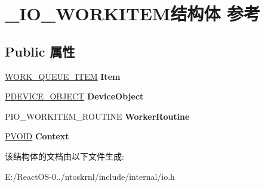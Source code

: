 \hypertarget{struct___i_o___w_o_r_k_i_t_e_m}{}\section{\+\_\+\+I\+O\+\_\+\+W\+O\+R\+K\+I\+T\+E\+M结构体 参考}
\label{struct___i_o___w_o_r_k_i_t_e_m}
\subsection*{Public 属性}
\begin{DoxyCompactItemize}
\item 
\mbox{\label{struct___i_o___w_o_r_k_i_t_e_m_ae60c3603568f212ae35aeee6782de711}} 
\hyperlink{struct___w_o_r_k___q_u_e_u_e___i_t_e_m}{W\+O\+R\+K\+\_\+\+Q\+U\+E\+U\+E\+\_\+\+I\+T\+EM} {\bfseries Item}
\item 
\mbox{\label{struct___i_o___w_o_r_k_i_t_e_m_a36087263b4546ce34ec34a4831d6c235}} 
\hyperlink{struct___d_e_v_i_c_e___o_b_j_e_c_t}{P\+D\+E\+V\+I\+C\+E\+\_\+\+O\+B\+J\+E\+CT} {\bfseries Device\+Object}
\item 
\mbox{\label{struct___i_o___w_o_r_k_i_t_e_m_a0da5511f9c8a78a04233cfd8806619fd}} 
P\+I\+O\+\_\+\+W\+O\+R\+K\+I\+T\+E\+M\+\_\+\+R\+O\+U\+T\+I\+NE {\bfseries Worker\+Routine}
\item 
\mbox{\label{struct___i_o___w_o_r_k_i_t_e_m_aef1db08e12c1404726aa9402140805d7}} 
\hyperlink{interfacevoid}{P\+V\+O\+ID} {\bfseries Context}
\end{DoxyCompactItemize}


该结构体的文档由以下文件生成\+:\begin{DoxyCompactItemize}
\item 
E\+:/\+React\+O\+S-\/0../ntoskrnl/include/internal/io.\+h\end{DoxyCompactItemize}
